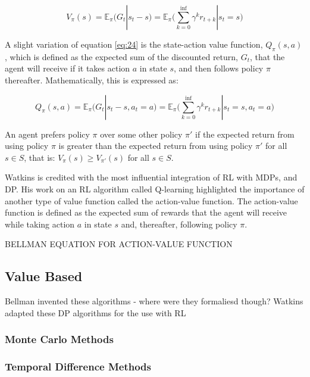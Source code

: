\begin{equation}
	V_{\pi}(s) = \mathbb{E}_{\pi} \big( G_t | s_t - s \big) = \mathbb{E}_{\pi} \bigg( \sum_{k = 0}^{\inf} \gamma^k r_{t+k} | s_t = s \bigg) \label{eq:24}
\end{equation}

A slight variation of equation \ref{eq:24} is the state-action value function, $Q_{\pi}(s,a)$, which is defined as the expected sum of the discounted return, $G_t$, that the agent will receive if it takes action $a$ in state $s$, and then follows policy $\pi$ thereafter. Mathematically, this is expressed as:

\begin{equation}
	Q_{\pi}(s, a) = \mathbb{E}_{\pi} \big( G_t | s_t - s, a_t = a \big) = \mathbb{E}_{\pi} \bigg( \sum_{k = 0}^{\inf} \gamma^k r_{t+k} | s_t = s, a_t = a \bigg) \label{eq:25}
\end{equation}



An agent prefers policy $\pi$ over some other policy $\pi'$ if the expected return from using policy $\pi$ is greater than the expected return from using policy $\pi'$ for all $s \in S$, that is: $V_{\pi}(s) \geq V_{\pi'}(s)$ for all $s \in S$.

Watkins is credited with the most influential integration of RL with MDPs, and DP. His work on an RL algorithm called Q-learning highlighted the importance of another type of value function called the action-value function. The action-value function is defined as the expected sum of rewards that the agent will receive while taking action $a$ in state $s$ and, thereafter, following policy $\pi$.






BELLMAN EQUATION FOR ACTION-VALUE FUNCTION

\subsection{Value Based}
Bellman invented these algorithms - where were they formaliesd though? Watkins adapted these DP algorithms for the use with RL

\subsubsection{Monte Carlo Methods}

\subsubsection{Temporal Difference Methods}

